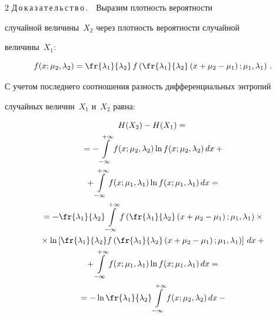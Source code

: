 \begin{multicols}{2}
  Д\,о\,к\,а\,з\,а\,т\,е\,л\,ь\,с\,т\,в\,о\,.\ \  Выразим плотность вероятности 

случайной величины~$X_2$ через плотность вероятности случайной 

величины~$X_1$:

  $$

  f(x;\mu_2,\lambda_2) =\fr{\lambda_1}{\lambda_2}\,f\left( 

\fr{\lambda_1}{\lambda_2}\left( x+\mu_2-\mu_1\right);\mu_1,\lambda_1\right)\,.

  $$

  

  С учетом последнего соотношения разность дифференциальных энтропий 

случайных величин~$X_1$ и~$X_2$ равна:



\noindent

  \begin{multline*}

  H(X_2) -H(X_1) = {}\\

  {}= -\int\limits_{-\infty}^{+\infty} f(x;\mu_2,\lambda_2)\ln 

f(x;\mu_2,\lambda_2)\,dx

  +{}\\

  {}+ \int\limits_{-\infty}^{+\infty} f(x;\mu_1,\lambda_1)\ln 

f(x;\mu_1,\lambda_1)\,dx={}\\

  {}= -\fr{\lambda_1}{\lambda_2} \int\limits_{-\infty}^{+\infty} f\left( 

\fr{\lambda_1}{\lambda_2}\left( x+\mu_2-\mu_1\right);\mu_1,\lambda_1\right) \times{}\\

{}\times\ln 

\left[ \fr{\lambda_1}{\lambda_2}f \left( \fr{\lambda_1}{\lambda_2}\left( x+\mu_2-\mu_1\right);\mu_1,\lambda_1 

\right)\right]\,dx+{}\\

  {}+ \int\limits_{-\infty}^{+\infty} f(x;\mu_1,\lambda_1)\ln 

f(x;\mu_1,\lambda_1)\,dx= {}\\

{}=-\ln \fr{\lambda_1}{\lambda_2} \int\limits_{-

\infty}^{+\infty} f(x;\mu_2,\lambda_2)\,dx-{}\\


\end{multline*}
\end{multicols}
